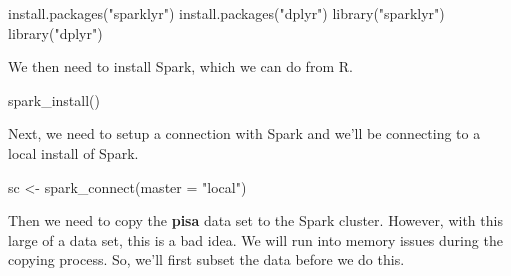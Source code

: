 \documentclass[
]{book}
\newenvironment{Shaded}{\begin{snugshade}}{\end{snugshade}}
\newcommand{\AttributeTok}[1]{\textcolor[rgb]{0.77,0.63,0.00}{#1}}
\newcommand{\FunctionTok}[1]{\textcolor[rgb]{0.00,0.00,0.00}{#1}}
\newcommand{\NormalTok}[1]{#1}
\newcommand{\OtherTok}[1]{\textcolor[rgb]{0.56,0.35,0.01}{#1}}
\newcommand{\StringTok}[1]{\textcolor[rgb]{0.31,0.60,0.02}{#1}}
\begin{document}
\begin{Shaded}
\begin{Highlighting}[]
\FunctionTok{install.packages}\NormalTok{(}\StringTok{"sparklyr"}\NormalTok{)}
\FunctionTok{install.packages}\NormalTok{(}\StringTok{"dplyr"}\NormalTok{)}
\FunctionTok{library}\NormalTok{(}\StringTok{"sparklyr"}\NormalTok{)}
\FunctionTok{library}\NormalTok{(}\StringTok{"dplyr"}\NormalTok{)}
\end{Highlighting}
\end{Shaded}

We then need to install Spark, which we can do from R.

\begin{Shaded}
\begin{Highlighting}[]
\FunctionTok{spark\_install}\NormalTok{()}
\end{Highlighting}
\end{Shaded}

Next, we need to setup a connection with Spark and we'll be connecting to a local install of Spark.

\begin{Shaded}
\begin{Highlighting}[]
\NormalTok{sc }\OtherTok{\textless{}{-}} \FunctionTok{spark\_connect}\NormalTok{(}\AttributeTok{master =} \StringTok{"local"}\NormalTok{)}
\end{Highlighting}
\end{Shaded}

Then we need to copy the \textbf{pisa} data set to the Spark cluster. However, with this large of a data set, this is a bad idea. We will run into memory issues during the copying process. So, we'll first subset the data before we do this.
\end{document}
